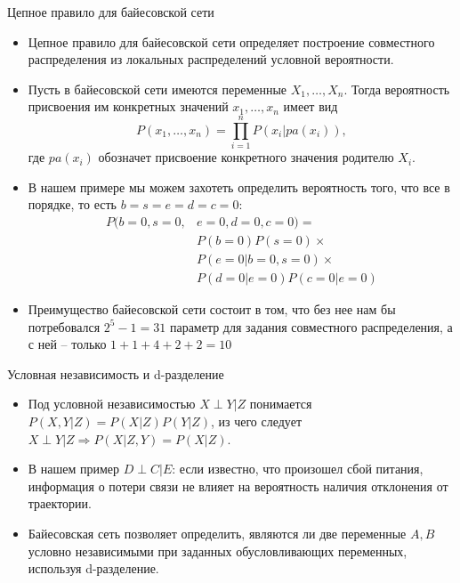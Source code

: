 \documentclass{beamer}
\begin{document}
\begin{frame}{Цепное правило для байесовской сети}
    \footnotesize

    \begin{itemize}
        \item Цепное правило для байесовской сети определяет построение совместного распределения из локальных распределений условной вероятности.
        \item Пусть в байесовской сети имеются переменные $X_1, \dots, X_n$. Тогда вероятность присвоения им конкретных значений $x_1, \dots, x_n$ имеет вид
        \begin{equation}
            P(x_1, \dots, x_n) = \prod_{i=1}^n P(x_i | pa(x_i)),
        \end{equation}
        где $pa(x_i)$ обозначет присвоение конкретного значения родителю $X_i$.
        \item В нашем примере мы можем захотеть определить вероятность того, что все в порядке, то есть $b = s = e = d = c = 0$:
        \begin{equation}
            \begin{split}
            P(b = 0, s = 0, &e = 0, d = 0, c = 0) = \\
            &P(b = 0) P(s = 0) \times \\
            &P(e = 0 | b = 0, s = 0) \times \\
            &P(d = 0 | e = 0) P(c = 0 | e = 0)
            \end{split}
        \end{equation}
        \item Преимущество байесовской сети состоит в том, что без нее нам бы потребовался $2^5 - 1 = 31$ параметр для задания совместного распределения, а с ней -- только $1 + 1 + 4 + 2 + 2 = 10$
    \end{itemize}
\end{frame}

\begin{frame}{Условная независимость и d-разделение}
    \footnotesize

    \begin{itemize}
        \item Под условной независимостью $X \perp Y | Z$ понимается $P(X, Y | Z) = P(X | Z) P(Y | Z)$, из чего следует $X \perp Y | Z \Longrightarrow P(X | Z, Y) = P(X | Z)$.
        \item В нашем пример $D \perp C | E$: если известно, что произошел сбой питания, информация о потери связи не влияет на вероятность наличия отклонения от траектории.
        \item Байесовская сеть позволяет определить, являются ли две переменные $A, B$ условно независимыми при заданных обусловливающих переменных, используя d-разделение. 
    \end{itemize}
\end{frame}
\end{document}
